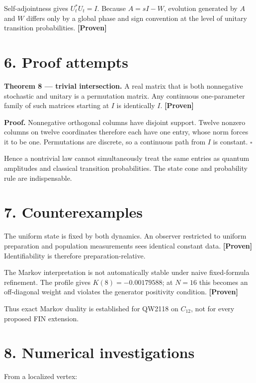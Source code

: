 \documentclass[11pt,a4paper,openany]{report}
\newcommand{\statusProven}{\textcolor{fingreen}{[Proven]}}
\begin{document}
Self-adjointness gives \(U_t^*U_t=I\). Because \(A=sI-W\), evolution generated by \(A\) and \(W\) differs only by a global phase and sign convention at the level of unitary transition probabilities. \textbf{\statusProven{}}

\section{6. Proof attempts}

\textbf{Theorem 8 — trivial intersection.} A real matrix that is both nonnegative stochastic and unitary is a permutation matrix. Any continuous one-parameter family of such matrices starting at \(I\) is identically \(I\). \textbf{\statusProven{}}

\textbf{Proof.} Nonnegative orthogonal columns have disjoint support. Twelve nonzero columns on twelve coordinates therefore each have one entry, whose norm forces it to be one. Permutations are discrete, so a continuous path from \(I\) is constant. \(\square\)

Hence a nontrivial law cannot simultaneously treat the same entries as quantum amplitudes and classical transition probabilities. The state cone and probability rule are indispensable.

\section{7. Counterexamples}

The uniform state is fixed by both dynamics. An observer restricted to uniform preparation and population measurements sees identical constant data. \textbf{\statusProven{}} Identifiability is therefore preparation-relative.

The Markov interpretation is not automatically stable under naive fixed-formula refinement. The profile gives \(K(8)=-0.00179588\); at \(N=16\) this becomes an off-diagonal weight and violates the generator positivity condition. \textbf{\statusProven{}}

Thus exact Markov duality is established for QW2118 on \(C_{12}\), not for every proposed FIN extension.

\section{8. Numerical investigations}

From a localized vertex:
\end{document}
